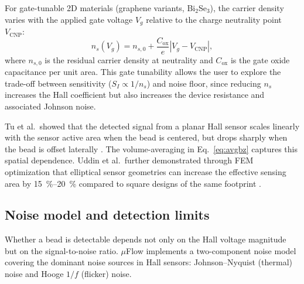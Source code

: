 \documentclass[preprint,review,12pt]{elsarticle}
\begin{document}
For gate-tunable 2D materials (graphene variants, Bi$_2$Se$_3$), the carrier density varies with the applied gate voltage $V_g$ relative to the charge neutrality point $V_{\text{CNP}}$:
\begin{equation}
n_s(V_g) = n_{s,0} + \frac{C_{\text{ox}}}{e} |V_g - V_{\text{CNP}}|,
\label{eq:gate}
\end{equation}
where $n_{s,0}$ is the residual carrier density at neutrality and $C_{\text{ox}}$ is the gate oxide capacitance per unit area. This gate tunability allows the user to explore the trade-off between sensitivity ($S_I \propto 1/n_s$) and noise floor, since reducing $n_s$ increases the Hall coefficient but also increases the device resistance and associated Johnson noise.

Tu et al.\ showed that the detected signal from a planar Hall sensor scales linearly with the sensor active area when the bead is centered, but drops sharply when the bead is offset laterally \cite{tu2009}. The volume-averaging in Eq.~\eqref{eq:avgbz} captures this spatial dependence. Uddin et al.\ further demonstrated through FEM optimization that elliptical sensor geometries can increase the effective sensing area by \SIrange{15}{20}{\percent} compared to square designs of the same footprint \cite{uddin2022}.

\subsection{Noise model and detection limits}
\label{sec:noise}

Whether a bead is detectable depends not only on the Hall voltage magnitude but on the signal-to-noise ratio. $\mu$Flow implements a two-component noise model covering the dominant noise sources in Hall sensors: Johnson--Nyquist (thermal) noise and Hooge $1/f$ (flicker) noise.
\end{document}
